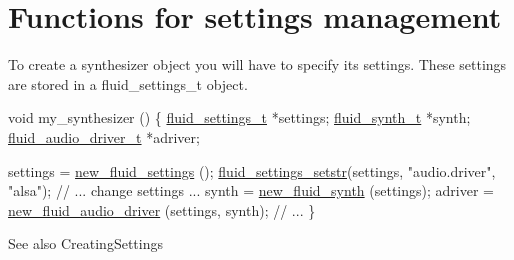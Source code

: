 \hypertarget{group__SettingsFunctions}{}\section{Functions for settings management}
\label{group__SettingsFunctions}
To create a synthesizer object you will have to specify its settings. These settings are stored in a fluid\+\_\+settings\+\_\+t object. 
\begin{DoxyCode}
\textcolor{keywordtype}{void}
my\_synthesizer ()
\{
  \hyperlink{struct__fluid__hashtable__t}{fluid\_settings\_t} *settings;
  \hyperlink{struct__fluid__synth__t}{fluid\_synth\_t} *synth;
  \hyperlink{struct__fluid__audio__driver__t}{fluid\_audio\_driver\_t} *adriver;

  settings = \hyperlink{settings_8h_ad7ab9269a28c2b5852d512ffe3546949}{new\_fluid\_settings} ();
  \hyperlink{settings_8h_a855e6038c9946b206156eb1947746032}{fluid\_settings\_setstr}(settings, \textcolor{stringliteral}{"audio.driver"}, \textcolor{stringliteral}{"alsa"});
  \textcolor{comment}{// ... change settings ...}
  synth = \hyperlink{synth_8h_a344f7369c0f57d30f72702d0c88e6178}{new\_fluid\_synth} (settings);
  adriver = \hyperlink{fluid__adriver_8c_a7c66ef86f0008807bdd955770fca6925}{new\_fluid\_audio\_driver} (settings, synth);
  \textcolor{comment}{// ...}
\}
\end{DoxyCode}
 \begin{DoxySeeAlso}{See also}
Creating\+Settings 
\end{DoxySeeAlso}
